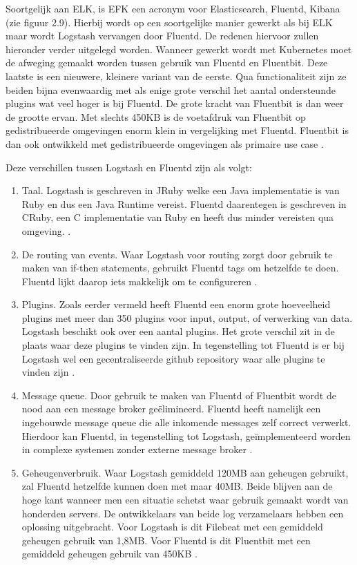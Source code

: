 Soortgelijk aan ELK, is EFK een acronym voor Elasticsearch, Fluentd, Kibana (zie figuur 2.9). Hierbij wordt op een soortgelijke manier gewerkt als bij ELK maar wordt Logstash vervangen door Fluentd. De redenen hiervoor zullen hieronder verder uitgelegd worden. Wanneer gewerkt wordt met Kubernetes moet de afweging gemaakt worden tussen gebruik van Fluentd en Fluentbit. Deze laatste is een nieuwere, kleinere variant van de eerste. Qua functionaliteit zijn ze beiden bijna evenwaardig met als enige grote verschil het aantal ondersteunde plugins wat veel hoger is bij Fluentd. De grote kracht van Fluentbit is dan weer de grootte ervan. Met slechts 450KB is de voetafdruk van Fluentbit op gedistribueerde omgevingen enorm klein in vergelijking met Fluentd. Fluentbit is dan ook ontwikkeld met gedistribueerde omgevingen als primaire use case \autocite{berman2018-06}.

Deze verschillen tussen Logstash en Fluentd zijn als volgt:
\begin{enumerate}
    \item Taal. Logstash is geschreven in JRuby welke een Java implementatie is van Ruby en dus een Java Runtime vereist. Fluentd daarentegen is geschreven in CRuby, een C implementatie van Ruby en heeft dus minder vereisten qua omgeving.  \autocite{harikumar2018}.
    \item De routing van events. Waar Logstash voor routing zorgt door gebruik te maken van if-then statements, gebruikt Fluentd tags om hetzelfde te doen. Fluentd lijkt daarop iets makkelijk om te configureren \autocite{harikumar2018}.
    \item Plugins. Zoals eerder vermeld heeft Fluentd een enorm grote hoeveelheid plugins met meer dan 350 plugins voor input, output, of verwerking van data. Logstash beschikt ook over een aantal plugins. Het grote verschil zit in de plaats waar deze plugins te vinden zijn. In tegenstelling tot Fluentd is er bij Logstash wel een gecentraliseerde github repository waar alle plugins te vinden zijn \autocite{harikumar2018}.
    \item Message queue. Door gebruik te maken van Fluentd of Fluentbit wordt de nood aan een message broker geëlimineerd. Fluentd heeft namelijk een ingebouwde message queue die alle inkomende messages zelf correct verwerkt. Hierdoor kan Fluentd, in tegenstelling tot Logstash, geïmplementeerd worden in complexe systemen zonder externe message broker \autocite{harikumar2018}. 
    \item Geheugenverbruik. Waar Logstash gemiddeld 120MB aan geheugen gebruikt, zal Fluentd hetzelfde kunnen doen met maar 40MB. Beide blijven aan de hoge kant wanneer men een situatie schetst waar gebruik gemaakt wordt van honderden servers. De ontwikkelaars van beide log verzamelaars hebben een oplossing uitgebracht. Voor Logstash is dit Filebeat met een gemiddeld geheugen gebruik van 1,8MB. Voor Fluentd is dit Fluentbit met een gemiddeld geheugen gebruik van 450KB \autocite{peri2015}.
\end{enumerate}

